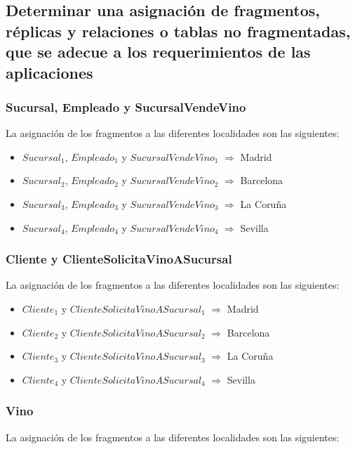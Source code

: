 \documentclass[paper=a4, fontsize=12pt]{article} %
\numberwithin{equation}{section} %
\numberwithin{figure}{section} %
\numberwithin{table}{section} %
\begin{document}
\newpage
\subsection{Determinar una asignación de fragmentos, réplicas y relaciones o tablas no fragmentadas, que se adecue a los requerimientos de las aplicaciones}

\subsubsection{Sucursal, Empleado y SucursalVendeVino}
La asignación de los fragmentos a las diferentes localidades son las siguientes:

\begin{itemize}
\item $Sucursal_{1}$, $Empleado_{1}$ y $SucursalVendeVino_{1}$ $\Rightarrow$ Madrid
\item $Sucursal_{2}$, $Empleado_{2}$ y $SucursalVendeVino_{2}$ $\Rightarrow$ Barcelona
\item $Sucursal_{3}$, $Empleado_{3}$ y $SucursalVendeVino_{3}$ $\Rightarrow$ La Coruña
\item $Sucursal_{4}$, $Empleado_{4}$ y $SucursalVendeVino_{4}$ $\Rightarrow$ Sevilla
\end{itemize}

\subsubsection{Cliente y ClienteSolicitaVinoASucursal}
La asignación de los fragmentos a las diferentes localidades son las siguientes:

\begin{itemize}
\item $Cliente_{1}$ y $ClienteSolicitaVinoASucursal_{1}$ $\Rightarrow$ Madrid
\item $Cliente_{2}$ y $ClienteSolicitaVinoASucursal_{2}$ $\Rightarrow$ Barcelona
\item $Cliente_{3}$ y $ClienteSolicitaVinoASucursal_{3}$ $\Rightarrow$ La Coruña
\item $Cliente_{4}$ y $ClienteSolicitaVinoASucursal_{4}$ $\Rightarrow$ Sevilla
\end{itemize}

\subsubsection{Vino}
La asignación de los fragmentos a las diferentes localidades son las siguientes:
\end{document}
